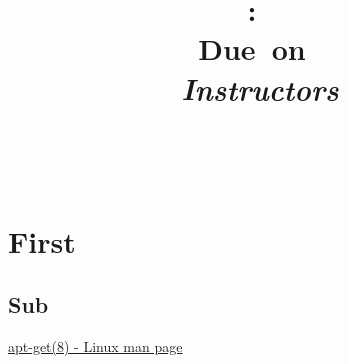\documentclass[12pt]{article}
\title{
    \vspace{2in}
    \textmd{\textbf{\hmwkClass:\ \hmwkTitle}}\\
    \normalsize\vspace{0.1in}\small{Due\ on\ \hmwkDueDate}\\
    \vspace{0.1in}\large{\textit{Instructors \hmwkClassInstructor}}
    \vspace{3in}
}
\author{\hmwkAuthorNameA\\\hmwkAuthorNameB\\\hmwkAuthorNameC}
\date{}
\begin{document}

\maketitle
\pagebreak
{}

\section{First}
\subsection{Sub}

\begin{thebibliography}{9}
  \href{http://linux.die.net/man/8/apt-get}{apt-get(8) - Linux man page}
\end{thebibliography}

\end{document}
